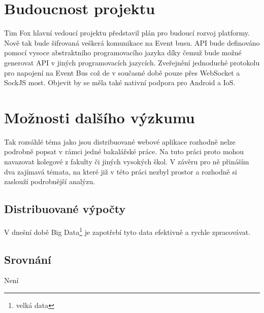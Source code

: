 \section{Budoucnost projektu}

Tim Fox hlavní vedoucí projektu představil plán\cite{plan} pro budoucí rozvoj platformy. Nově tak bude šifrovaná veškerá komunikace na Event busu. API bude definováno pomocí vysoce abstraktního programovacího jazyka díky čemuž bude možné generovat API v jiných programovacích jazycích. Zveřejnění jednoduché protokolu pro napojení na Event Bus což de v současné době pouze přes WebSocket a SockJS most. Objevit by se měla také nativní podpora pro Android a IoS.

\section{Možnosti dalšího výzkumu}

Tak rozsáhlé téma jako jsou distribuované webové aplikace rozhodně nelze podrobně popsat v rámci 
jedné bakalářské práce. Na tuto práci proto mohou navazovat kolegové z fakulty či jiných 
vysokých škol. V závěru pro ně přináším dva zajímavá témata, na které již v této práci 
nezbyl prostor a rozhodně si zaslouží podrobnější analýzu.
 
\subsection{Distribuované výpočty}

V dnešní době Big Data\footnote{velká data} je zapotřebí tyto data efektivně a rychle zpracovávat. 

\subsection{Srovnání}

Není
